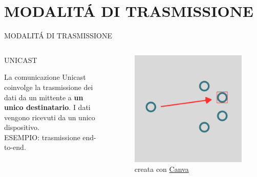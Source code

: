 \documentclass[aspectratio=1610]{beamer}
\begin{document}
\section{MODALIT\'A DI TRASMISSIONE}

\begin{frame}{MODALIT\'A DI TRASMISSIONE}
    \begin{columns}
        \begin{alertblock}{UNICAST}
            \begin{minipage}{0.96\linewidth}
                \justifying
                La comunicazione Unicast coinvolge la trasmissione dei dati da un mittente a \textbf{un 
                unico destinatario}. I dati vengono ricevuti da un unico dispositivo.\\
                ESEMPIO: trasmissione end-to-end.
            \end{minipage}
        \end{alertblock}
           \begin{figure}
               \includegraphics[width=\linewidth]{img/unicast.png}
               \caption{{creata con \href{https://www.canva.com}{Canva}}}
           \end{figure}
    \end{columns}
\end{frame}
\end{document}
